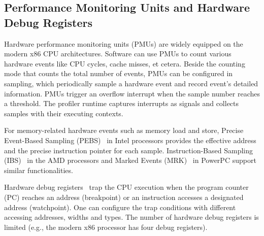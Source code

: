 \subsection{Performance Monitoring Units and Hardware Debug Registers}
Hardware performance monitoring units (PMUs) are widely equipped on the modern x86 CPU architectures. Software can use PMUs to count various hardware events like CPU cycles, cache misses, et cetera. Beside the counting mode that counts the total number of events, PMUs can be configured in sampling, which periodically sample a hardware event and record event's detailed information. PMUs trigger an overflow interrupt when the sample number reaches a threshold. The profiler runtime captures interrupts as signals and collects samples with their executing contexts.

For memory-related hardware events such as memory load and store, Precise Event-Based Sampling (PEBS)~\cite{pebs} in Intel processors provides the effective address and the precise instruction pointer for each sample. Instruction-Based Sampling (IBS)~\cite{ibs} in the AMD processors and Marked Events (MRK)~\cite{srinivas2011ibm} in PowerPC support similar functionalities.

Hardware debug registers~\cite{johnson1982some, mclear1982guidelines} trap the CPU execution when the program counter (PC) reaches an address (breakpoint) or an instruction accesses a designated address (watchpoint). One can configure the trap conditions with different accessing addresses, widths and types. The number of hardware debug registers is limited (e.g., the modern x86 processor has four debug registers).








